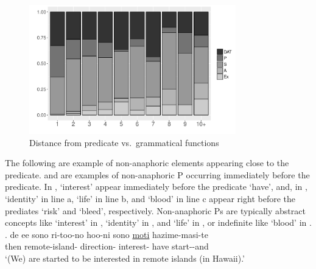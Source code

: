 \begin{figure}
	\begin{center}
	\includegraphics[width=0.8\textwidth]{figure/DiffASP.pdf}
	\caption{Distance from predicate vs.~grammatical functions}
	\label{WO:Prep:New:DiffASPF}
	\end{center}
\end{figure}


The following are example of non-anaphoric elements appearing close to the predicate.
\Next and \NNext are examples of non-anaphoric P occurring immediately before the predicate.
In \Next,
 `interest' appear immediately before the predicate  `have',
and, in \NNext,
 `identity' in line a,  `life' in line b, and  `blood' in line c appear right before the prediates  `risk' and  `bleed', respectively.
Non-anaphoric Ps are typically abstract concepts like  `interest' in \Next,  `identity' in \NNext[a], and  `life' in \NNext[b], or
indefinite like  `blood' in \NNext[c].
%
\exg. de ee sono ri-too-no hoo-ni sono  \ul{moti} hazime-masi-te \\
		then \ab{fl}  remote-island- direction-  interest- have start--and \\
	`(We) are started to be interested in remote islands (in Hawaii).'


